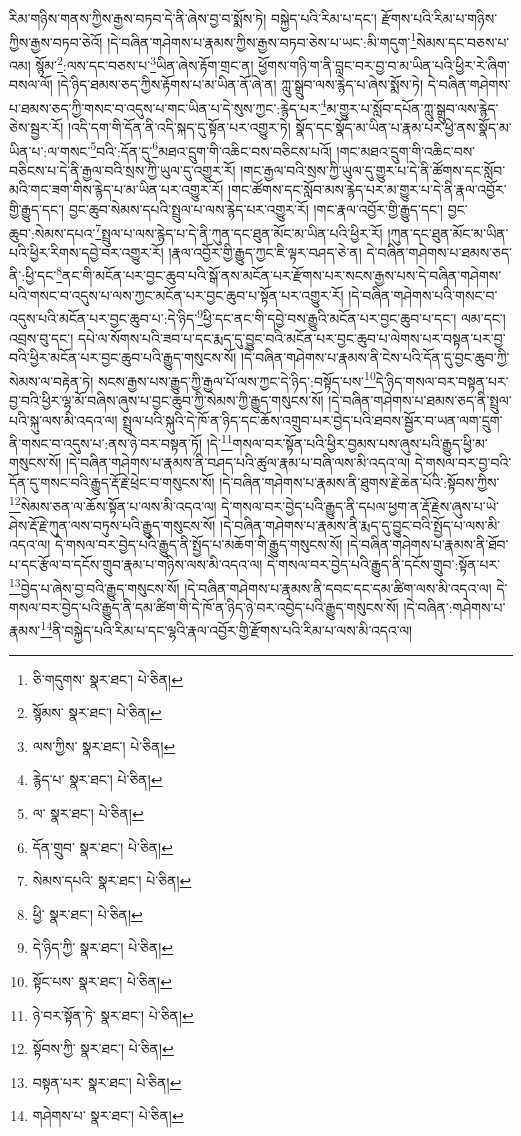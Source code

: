 རིམ་གཉིས་གནས་ཀྱིས་རྒྱས་བཏབ་དེ་ནི་ཞེས་བྱ་བ་སྨོས་ཏེ། བསྐྱེད་པའི་རིམ་པ་དང་། རྫོགས་པའི་རིམ་པ་གཉིས་ཀྱིས་རྒྱས་བཏབ་ཅེའོ། །དེ་བཞིན་གཤེགས་པ་རྣམས་ཀྱིས་རྒྱས་བཏབ་ཅེས་པ་ཡང་:མི་གདུག་\footnote{ཅི་གདུགས་  སྣར་ཐང་།  པེ་ཅིན། }སེམས་དང་བཅས་པ་འམ། སྙོམ་\footnote{སྙོམས་  སྣར་ཐང་།  པེ་ཅིན། }:ལས་དང་བཅས་པ་\footnote{ལས་ཀྱིས་  སྣར་ཐང་།  པེ་ཅིན། }ཡིན་ཞེས་རྟོག་གྲང་ན། ཕྱོགས་གཉི་ག་ནི་བླང་བར་བྱ་བ་མ་ཡིན་པའི་ཕྱིར་རེ་ཞིག་བསལ་ལོ། །དེ་ཉིད་ཐམས་ཅད་ཀྱིས་རྟོགས་པ་མ་ཡིན་ནོ་ཞེ་ན། ཀླུ་སྒྲུབ་ལས་རྙེད་པ་ཞེས་སྨོས་ཏེ། དེ་བཞིན་གཤེགས་པ་ཐམས་ཅད་ཀྱི་གསང་བ་འདུས་པ་གང་ཡིན་པ་དེ་སུས་ཀྱང་:རྙེད་པར་\footnote{རྙེད་པ་  སྣར་ཐང་།  པེ་ཅིན། }མ་གྱུར་པ་སློབ་དཔོན་ཀླུ་སྒྲུབ་ལས་རྙེད་ཅེས་སྦྱར་རོ། །འདི་དག་གི་དོན་ནི་འདི་སྐད་དུ་སྟོན་པར་འགྱུར་ཏེ། སྣོད་དང་སྣོད་མ་ཡིན་པ་རྣམ་པར་ཕྱེ་ནས་སྣོད་མ་ཡིན་པ་:ལ་གསང་\footnote{ལ་  སྣར་ཐང་།  པེ་ཅིན། }བའི་:དོན་དུ་\footnote{དོན་གྲུབ་  སྣར་ཐང་།  པེ་ཅིན། }མཐའ་དྲུག་གི་འཆིང་བས་བཅིངས་པའོ། །གང་མཐའ་དྲུག་གི་འཆིང་བས་བཅིངས་པ་དེ་ནི་རྒྱལ་བའི་སྲས་ཀྱི་ཡུལ་དུ་འགྱུར་རོ། །གང་རྒྱལ་བའི་སྲས་ཀྱི་ཡུལ་དུ་གྱུར་པ་དེ་ནི་ཚོགས་དང་སློབ་མའི་གང་ཟག་གིས་རྙེད་པ་མ་ཡིན་པར་འགྱུར་རོ། །གང་ཚོགས་དང་སློབ་མས་རྙེད་པར་མ་གྱུར་པ་དེ་ནི་རྣལ་འབྱོར་གྱི་རྒྱུད་དང་། བྱང་ཆུབ་སེམས་དཔའི་སྤྲུལ་པ་ལས་རྙེད་པར་འགྱུར་རོ། །གང་རྣལ་འབྱོར་གྱི་རྒྱུད་དང་། བྱང་ཆུབ་:སེམས་དཔའ་\footnote{སེམས་དཔའི་  སྣར་ཐང་།  པེ་ཅིན། }སྤྲུལ་པ་ལས་རྙེད་པ་དེ་ནི་ཀུན་དང་ཐུན་མོང་མ་ཡིན་པའི་ཕྱིར་རོ། །ཀུན་དང་ཐུན་མོང་མ་ཡིན་པའི་ཕྱིར་རིགས་དབྱེ་བར་འགྱུར་རོ། །རྣལ་འབྱོར་གྱི་རྒྱུད་ཀྱང་ཇི་ལྟར་བཤད་ཅེ་ན། དེ་བཞིན་གཤེགས་པ་ཐམས་ཅད་ནི་:ཕྱི་དང་\footnote{ཕྱི་  སྣར་ཐང་།  པེ་ཅིན། }ནང་གི་མངོན་པར་བྱང་ཆུབ་པའི་སྒོ་ནས་མངོན་པར་རྫོགས་པར་སངས་རྒྱས་པས་དེ་བཞིན་གཤེགས་པའི་གསང་བ་འདུས་པ་ལས་ཀྱང་མངོན་པར་བྱང་ཆུབ་པ་སྟོན་པར་འགྱུར་རོ། །དེ་བཞིན་གཤེགས་པའི་གསང་བ་འདུས་པའི་མངོན་པར་བྱང་ཆུབ་པ་:དེ་ཉིད་\footnote{དེ་ཉིད་ཀྱི་  སྣར་ཐང་།  པེ་ཅིན། }ཕྱི་དང་ནང་གི་དབྱེ་བས་རྒྱུའི་མངོན་པར་བྱང་ཆུབ་པ་དང་། ལམ་དང་། འབྲས་བུ་དང་། དཔེ་ལ་སོགས་པའི་ཟབ་པ་དང་རྨད་དུ་བྱུང་བའི་མངོན་པར་བྱང་ཆུབ་པ་ལེགས་པར་བསྟན་པར་བྱ་བའི་ཕྱིར་མངོན་པར་བྱང་ཆུབ་པའི་རྒྱུད་གསུངས་སོ། །དེ་བཞིན་གཤེགས་པ་རྣམས་ནི་ངེས་པའི་དོན་དུ་བྱང་ཆུབ་ཀྱི་སེམས་ལ་བརྟེན་ཏེ། སངས་རྒྱས་པས་རྒྱུད་ཀྱི་རྒྱལ་པོ་ལས་ཀྱང་དེ་ཉིད་:བསྟོད་པས་\footnote{སྟོང་པས་  སྣར་ཐང་།  པེ་ཅིན། }དེ་ཉིད་གསལ་བར་བསྟན་པར་བྱ་བའི་ཕྱིར་ལྷ་མོ་བཞིས་ཞུས་པ་བྱང་ཆུབ་ཀྱི་སེམས་ཀྱི་རྒྱུད་གསུངས་སོ། །དེ་བཞིན་གཤེགས་པ་ཐམས་ཅད་ནི་སྤྲུལ་པའི་སྐུ་ལས་མི་འདའ་ལ། སྤྲུལ་པའི་སྐུའི་དེ་ཁོ་ན་ཉིད་དང་ཆོས་འགྲུབ་པར་བྱེད་པའི་ཐབས་སྦྱོར་བ་ཡན་ལག་དྲུག་ནི་གསང་བ་འདུས་པ་:ནས་ཉེ་བར་བསྟན་ཏོ། །དེ་\footnote{ཉེ་བར་སྟོན་ཏེ་  སྣར་ཐང་།  པེ་ཅིན། }གསལ་བར་སྟོན་པའི་ཕྱིར་བྱམས་པས་ཞུས་པའི་རྒྱུད་ཕྱི་མ་གསུངས་སོ། །དེ་བཞིན་གཤེགས་པ་རྣམས་ནི་བཤད་པའི་ཚུལ་རྣམ་པ་བཞི་ལས་མི་འདའ་ལ། དེ་གསལ་བར་བྱ་བའི་དོན་དུ་གསང་བའི་རྒྱུད་རྡོ་རྗེ་ཕྲེང་བ་གསུངས་སོ། །དེ་བཞིན་གཤེགས་པ་རྣམས་ནི་ཐུགས་རྗེ་ཆེན་པོའི་:སྟོབས་ཀྱིས་\footnote{སྟོབས་ཀྱི་  སྣར་ཐང་།  པེ་ཅིན། }སེམས་ཅན་ལ་ཆོས་སྟོན་པ་ལས་མི་འདའ་ལ། དེ་གསལ་བར་བྱེད་པའི་རྒྱུད་ནི་དཔལ་ཕྱག་ན་རྡོ་རྗེས་ཞུས་པ་ཡེ་ཤེས་རྡོ་རྗེ་ཀུན་ལས་བཏུས་པའི་རྒྱུད་གསུངས་སོ། །དེ་བཞིན་གཤེགས་པ་རྣམས་ནི་རྨད་དུ་བྱུང་བའི་སྤྱོད་པ་ལས་མི་འདའ་ལ། དེ་གསལ་བར་བྱེད་པའི་རྒྱུད་ནི་སྤྱོད་པ་མཆོག་གི་རྒྱུད་གསུངས་སོ། །དེ་བཞིན་གཤེགས་པ་རྣམས་ནི་ཐོབ་པ་དང་རྩོལ་བ་དངོས་གྲུབ་རྣམ་པ་གཉིས་ལས་མི་འདའ་ལ། དེ་གསལ་བར་བྱེད་པའི་རྒྱུད་ནི་དངོས་གྲུབ་:སྟོན་པར་\footnote{བསྟན་པར་  སྣར་ཐང་།  པེ་ཅིན། }བྱེད་པ་ཞེས་བྱ་བའི་རྒྱུད་གསུངས་སོ། །དེ་བཞིན་གཤེགས་པ་རྣམས་ནི་དབང་དང་དམ་ཚིག་ལས་མི་འདའ་ལ། དེ་གསལ་བར་བྱེད་པའི་རྒྱུད་ནི་དམ་ཚིག་གི་དེ་ཁོ་ན་ཉིད་ཉེ་བར་འབྱེད་པའི་རྒྱུད་གསུངས་སོ། །དེ་བཞིན་:གཤེགས་པ་རྣམས་\footnote{གཤེགས་པ་  སྣར་ཐང་།  པེ་ཅིན། }ནི་བསྐྱེད་པའི་རིམ་པ་དང་ལྷའི་རྣལ་འབྱོར་གྱི་རྫོགས་པའི་རིམ་པ་ལས་མི་འདའ་ལ། 